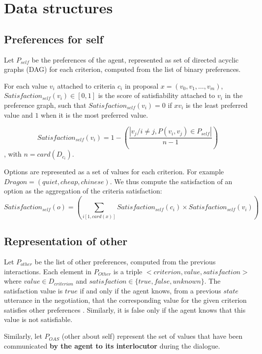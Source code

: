 \documentclass{article}
\begin{document}
	\title{\vskip -10pt}
	
	\author{Lydia Ould Ouali, Charles Rich \and
	Nicolas Sabouret }
	

\section{Data structures}

\subsection{Preferences for self}
Let $P_{self}$ be the preferences of the agent, represented as set of directed acyclic graphs (DAG) for each criterion, computed from the list of binary preferences.

For each value $v_i$ attached to criteria $c_i$ in proposal $x=(v_0,v_1,\ldots,v_m)$, $Satisfaction_{self}(v_i)\in[0, 1]$ is the score of satisfiability attached to $v_i$ in the preference graph, such that $Satisfaction_{self}(v_i) =0$ if $xv_i$ is the least preferred value and $1$ when it is the most preferred value.

$$Satisfaction_{self}(v_i) = 1 - \left(\frac{|v_j / i \not= j, P(v_i,v_j) \in P_{self}|}{n-1}\right)$$
, with $n=card(D_{c_i})$. 

Options are represented as a set of values for each criterion. For example $Dragon=(quiet,cheap,chinese)$. We thus compute the satisfaction of an option as the aggregation  of the criteria satisfaction:  
$$Satisfaction_{self}(o) = \left(\sum_{i[1,card(x)]} Satisfaction_{self}(c_i)\times  Satisfaction_{self}(v_i)\right)$$




\subsection{Representation of other}
Let $P_{other}$ be the list of other preferences, computed from the previous interactions. Each element in $P_{Other}$ is a triple $<criterion,value,satisfaction>$ where $value\in D_{criterion}$ and $satisfaction\in\{true,false,unknown\}$. The satisfaction value is $true$ if and only if the agent knows, from a previous $state$ utterance in the negotiation, that the corresponding value for the given criterion satisfies other preferences . Similarly, it is false only if the agent knows that this value is not satisfiable.

Similarly, let $P_{OAS}$ (other about self) represent the set of values that have been communicated \textbf{by the agent to its interlocutor} during the dialogue.
\end{document}
